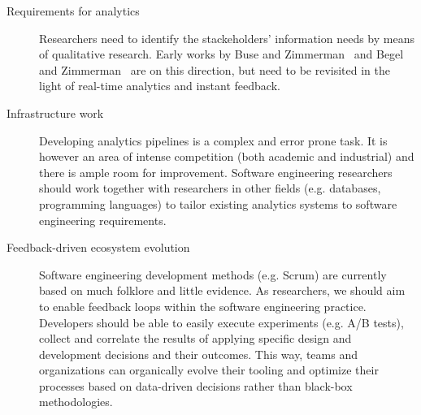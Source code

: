 \begin{description}

\item[Requirements for analytics] Researchers need to identify the
  stackeholders' information needs by means of qualitative research. Early works
  by Buse and Zimmerman~\cite{Buse:2012:INS:2337223.2337343} and Begel and
  Zimmerman~\cite{Begel.Zimmerman_AnalyzeThis:2013} are on this direction, but
  need to be revisited in the light of real-time analytics and instant feedback.

\item[Infrastructure work] Developing analytics pipelines is a complex and error
  prone task. It is however an area of intense competition (both academic and
  industrial) and there is ample room for improvement. Software engineering
  researchers should work together with researchers in other fields (e.g.
  databases, programming languages) to tailor existing analytics systems to
  software engineering requirements.

\item[Feedback-driven ecosystem evolution] Software engineering development
  methods (e.g. Scrum) are currently based on much folklore and little
  evidence. As researchers, we should aim to enable feedback loops within the
  software engineering practice. Developers should be able to easily execute
  experiments (e.g. A/B tests), collect and correlate the results of applying
  specific design and development decisions and their outcomes. This way, teams
  and organizations can organically evolve their tooling and optimize their
  processes based on data-driven decisions rather than black-box methodologies.


\end{description}
